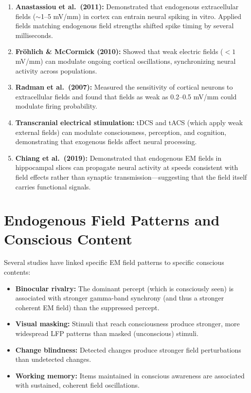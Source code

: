 \documentclass[11pt,a4paper]{report}
\begin{document}
\begin{evidbox}
\begin{enumerate}[leftmargin=1.5em]
  \item \textbf{Anastassiou et al.\ (2011):} Demonstrated that endogenous extracellular fields ($\sim$1--5 mV/mm) in cortex can entrain neural spiking in vitro. Applied fields matching endogenous field strengths shifted spike timing by several milliseconds.
  \item \textbf{Fr\"ohlich \& McCormick (2010):} Showed that weak electric fields ($< 1$ mV/mm) can modulate ongoing cortical oscillations, synchronizing neural activity across populations.
  \item \textbf{Radman et al.\ (2007):} Measured the sensitivity of cortical neurons to extracellular fields and found that fields as weak as 0.2--0.5 mV/mm could modulate firing probability.
  \item \textbf{Transcranial electrical stimulation:} tDCS and tACS (which apply weak external fields) can modulate consciousness, perception, and cognition, demonstrating that exogenous fields affect neural processing.
  \item \textbf{Chiang et al.\ (2019):} Demonstrated that endogenous EM fields in hippocampal slices can propagate neural activity at speeds consistent with field effects rather than synaptic transmission---suggesting that the field itself carries functional signals.
\end{enumerate}
\end{evidbox}

\section{Endogenous Field Patterns and Conscious Content}

Several studies have linked specific EM field patterns to specific conscious contents:

\begin{itemize}[leftmargin=1.5em]
  \item \textbf{Binocular rivalry:} The dominant percept (which is consciously seen) is associated with stronger gamma-band synchrony (and thus a stronger coherent EM field) than the suppressed percept.
  \item \textbf{Visual masking:} Stimuli that reach consciousness produce stronger, more widespread LFP patterns than masked (unconscious) stimuli.
  \item \textbf{Change blindness:} Detected changes produce stronger field perturbations than undetected changes.
  \item \textbf{Working memory:} Items maintained in conscious awareness are associated with sustained, coherent field oscillations.
\end{itemize}
\end{document}
